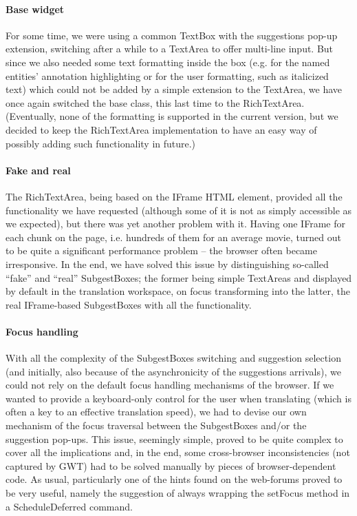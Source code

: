 \paragraph{Base widget}
For some time, we were using a common TextBox with the suggestions pop-up extension, switching after a while to a TextArea to offer multi-line input. But since we also needed some text formatting inside the box (e.g. for the named entities' annotation highlighting or for the user formatting, such as italicized text) which could not be added by a simple extension to the TextArea, we have once again switched the base class, this last time to the RichTextArea.
(Eventually, none of the formatting is supported in the current version, but we decided to keep the RichTextArea implementation to have an easy way of possibly adding such functionality in future.)

\paragraph{Fake and real}
The RichTextArea, being based on the IFrame HTML element, provided all the functionality we have requested (although some of it is not as simply accessible as we expected), but there was yet another problem with it. Having one IFrame for each chunk on the page, i.e. hundreds of them for an average movie, turned out to be quite a significant performance problem -- the browser often became irresponsive. In the end, we have solved this issue by distinguishing so-called ``fake'' and ``real'' SubgestBoxes; the former being simple TextAreas and displayed by default in the translation workspace, on focus transforming into the latter, the real IFrame-based SubgestBoxes with all the functionality.

\paragraph{Focus handling}
With all the complexity of the SubgestBoxes switching and suggestion selection (and initially, also because of the asynchronicity of the suggestions arrivals), we could not rely on the default focus handling mechanisms of the browser. If we wanted to provide a keyboard-only control for the user when translating (which is often a key to an effective translation speed), we had to devise our own mechanism of the focus traversal between the SubgestBoxes and/or the suggestion pop-ups. This issue, seemingly simple, proved to be quite complex to cover all the implications and, in the end, some cross-browser inconsistencies (not captured by GWT) had to be solved manually by pieces of browser-dependent code. As usual, particularly one of the hints found on the web-forums proved to be very useful, namely the suggestion of always wrapping the setFocus method in a ScheduleDeferred command.

